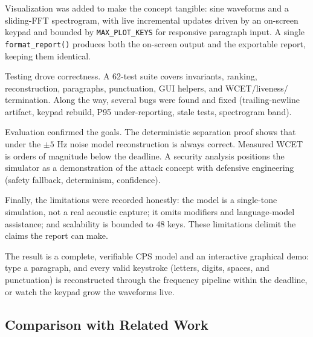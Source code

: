 \documentclass[11pt,a4paper]{article}
\begin{document}
Visualization was added to make the concept tangible: sine waveforms and a
sliding-FFT spectrogram, with live incremental updates driven by an on-screen
keypad and bounded by \texttt{MAX\_PLOT\_KEYS} for responsive paragraph input.
A single \texttt{format\_report()} produces both the on-screen output and the
exportable report, keeping them identical.

Testing drove correctness. A 62-test suite covers invariants, ranking,
reconstruction, paragraphs, punctuation, GUI helpers, and WCET/liveness/
termination. Along the way, several bugs were found and fixed (trailing-newline
artifact, keypad rebuild, P95 under-reporting, stale tests, spectrogram band).

Evaluation confirmed the goals. The deterministic separation proof shows that
under the $\pm 5$ Hz noise model reconstruction is always correct. Measured WCET
is orders of magnitude below the deadline. A security analysis positions the
simulator as a demonstration of the attack concept with defensive engineering
(safety fallback, determinism, confidence).

Finally, the limitations were recorded honestly: the model is a single-tone
simulation, not a real acoustic capture; it omits modifiers and language-model
assistance; and scalability is bounded to 48 keys. These limitations delimit
the claims the report can make.

The result is a complete, verifiable CPS model and an interactive graphical
demo: type a paragraph, and every valid keystroke (letters, digits, spaces, and
punctuation) is reconstructed through the frequency pipeline within the
deadline, or watch the keypad grow the waveforms live.

\subsection{Comparison with Related Work}
\label{sec:related}
\end{document}
